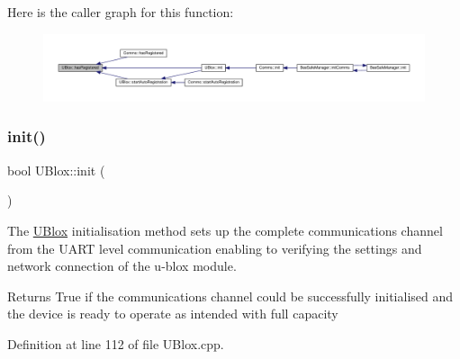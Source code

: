 Here is the caller graph for this function\+:\nopagebreak
\begin{figure}[H]
\begin{center}
\leavevmode
\includegraphics[width=350pt]{da/df6/class_u_blox_a1889c2b9bb6087bc939bd2a27b68623b_icgraph}
\end{center}
\end{figure}
\mbox{\label{class_u_blox_a34c2f507ff3bbd21b9aea788a015527a}} 
\subsubsection{\texorpdfstring{init()}{init()}}
{\footnotesize\ttfamily bool U\+Blox\+::init (\begin{DoxyParamCaption}{ }\end{DoxyParamCaption})}

The \hyperlink{class_u_blox}{U\+Blox} initialisation method sets up the complete communications channel from the U\+A\+RT level communication enabling to verifying the settings and network connection of the u-\/blox module.

\begin{DoxyReturn}{Returns}
True if the communications channel could be successfully initialised and the device is ready to operate as intended with full capacity 
\end{DoxyReturn}


Definition at line 112 of file U\+Blox.\+cpp.


